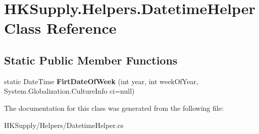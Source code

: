 \hypertarget{class_h_k_supply_1_1_helpers_1_1_datetime_helper}{}\section{H\+K\+Supply.\+Helpers.\+Datetime\+Helper Class Reference}
\label{class_h_k_supply_1_1_helpers_1_1_datetime_helper}
\subsection*{Static Public Member Functions}
\begin{DoxyCompactItemize}
\item 
\mbox{\label{class_h_k_supply_1_1_helpers_1_1_datetime_helper_a6d8cc384238541e6a70dc0ce12a21b49}} 
static Date\+Time {\bfseries Firt\+Date\+Of\+Week} (int year, int week\+Of\+Year, System.\+Globalization.\+Culture\+Info ci=null)
\end{DoxyCompactItemize}


The documentation for this class was generated from the following file\+:\begin{DoxyCompactItemize}
\item 
H\+K\+Supply/\+Helpers/Datetime\+Helper.\+cs\end{DoxyCompactItemize}
